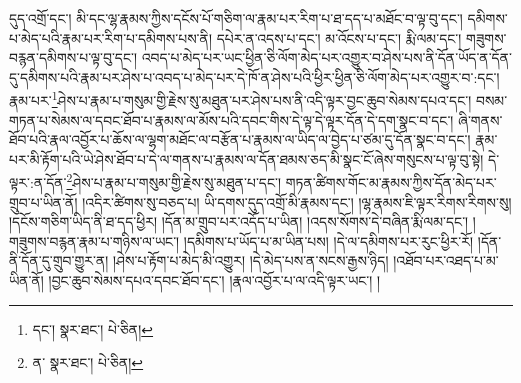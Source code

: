 དུད་འགྲོ་དང་། མི་དང་ལྷ་རྣམས་ཀྱིས་དངོས་པོ་གཅིག་ལ་རྣམ་པར་རིག་པ་ཐ་དད་པ་མཐོང་བ་ལྟ་བུ་དང་། དམིགས་པ་མེད་པའི་རྣམ་པར་རིག་པ་དམིགས་པས་ནི། དཔེར་ན་འདས་པ་དང་། མ་འོངས་པ་དང་། རྨི་ལམ་དང་། གཟུགས་བརྙན་དམིགས་པ་ལྟ་བུ་དང་། འབད་པ་མེད་པར་ཡང་ཕྱིན་ཅི་ལོག་མེད་པར་འགྱུར་བ་ཤེས་པས་ནི་དོན་ཡོད་ན་དོན་དུ་དམིགས་པའི་རྣམ་པར་ཤེས་པ་འབད་པ་མེད་པར་དེ་ཁོ་ན་ཤེས་པའི་ཕྱིར་ཕྱིན་ཅི་ལོག་མེད་པར་འགྱུར་བ་:དང་།རྣམ་པར་\footnote{དང་།  སྣར་ཐང་།  པེ་ཅིན། }ཤེས་པ་རྣམ་པ་གསུམ་གྱི་རྗེས་སུ་མཐུན་པར་ཤེས་པས་ནི་འདི་ལྟར་བྱང་ཆུབ་སེམས་དཔའ་དང་། བསམ་གཏན་པ་སེམས་ལ་དབང་ཐོབ་པ་རྣམས་ལ་མོས་པའི་དབང་གིས་དེ་ལྟ་དེ་ལྟར་དོན་དེ་དག་སྣང་བ་དང་། ཞི་གནས་ཐོབ་པའི་རྣལ་འབྱོར་པ་ཆོས་ལ་ལྷག་མཐོང་ལ་བརྩོན་པ་རྣམས་ལ་ཡིད་ལ་བྱེད་པ་ཙམ་དུ་དོན་སྣང་བ་དང་། རྣམ་པར་མི་རྟོག་པའི་ཡེ་ཤེས་ཐོབ་པ་དེ་ལ་གནས་པ་རྣམས་ལ་དོན་ཐམས་ཅད་མི་སྣང་ངོ་ཞེས་གསུངས་པ་ལྟ་བུ་སྟེ། དེ་ལྟར་:ན་དོན་\footnote{ན་  སྣར་ཐང་།  པེ་ཅིན། }ཤེས་པ་རྣམ་པ་གསུམ་གྱི་རྗེས་སུ་མཐུན་པ་དང་། གཏན་ཚིགས་གོང་མ་རྣམས་ཀྱིས་དོན་མེད་པར་གྲུབ་པ་ཡིན་ནོ། །འདིར་ཚིགས་སུ་བཅད་པ། ཡི་དགས་དུད་འགྲོ་མི་རྣམས་དང་། །ལྷ་རྣམས་ཇི་ལྟར་རིགས་རིགས་སུ། །དངོས་གཅིག་ཡིད་ནི་ཐ་དད་ཕྱིར། །དོན་མ་གྲུབ་པར་འདོད་པ་ཡིན། །འདས་སོགས་དེ་བཞིན་རྨི་ལམ་དང་། །གཟུགས་བརྙན་རྣམ་པ་གཉིས་ལ་ཡང་། །དམིགས་པ་ཡོད་པ་མ་ཡིན་པས། །དེ་ལ་དམིགས་པར་རུང་ཕྱིར་རོ། །དོན་ནི་དོན་དུ་གྲུབ་གྱུར་ན། །ཤེས་པ་རྟོག་པ་མེད་མི་འགྱུར། །དེ་མེད་པས་ན་སངས་རྒྱས་ཉིད། །འཐོབ་པར་འཐད་པ་མ་ཡིན་ནོ། །བྱང་ཆུབ་སེམས་དཔའ་དབང་ཐོབ་དང་། །རྣལ་འབྱོར་པ་ལ་འདི་ལྟར་ཡང་། །
